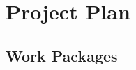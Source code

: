 \documentclass[thesis]{mas_proposal}
\begin{document}
\section{Project Plan}

\subsection{Work Packages}
\end{document}
